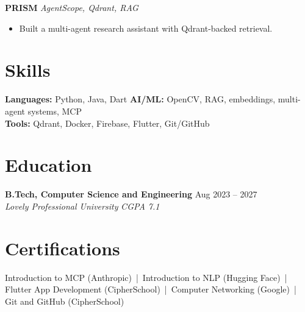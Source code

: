 \documentclass[10pt,a4paper]{article}
\newcommand{\role}[4]{\textbf{#1} \hfill #3\\ \textit{#2} \hfill \textit{#4}\par}
\newcommand{\proj}[2]{\textbf{#1} \hfill \textit{#2}\par}
\begin{document}
\proj{PRISM}{AgentScope, Qdrant, RAG}
\begin{itemize}
  \item Built a multi-agent research assistant with Qdrant-backed retrieval.
\end{itemize}

\section{Skills}
\textbf{Languages:} Python, Java, Dart \quad \textbf{AI/ML:} OpenCV, RAG, embeddings, multi-agent systems, MCP\\
\textbf{Tools:} Qdrant, Docker, Firebase, Flutter, Git/GitHub

\section{Education}
\role{B.Tech, Computer Science and Engineering}{Lovely Professional University}{Aug 2023 -- 2027}{CGPA 7.1}

\section{Certifications}
Introduction to MCP (Anthropic) \,|\, Introduction to NLP (Hugging Face) \,|\, Flutter App Development (CipherSchool) \,|\, Computer Networking (Google) \,|\, Git and GitHub (CipherSchool)
\end{document}
